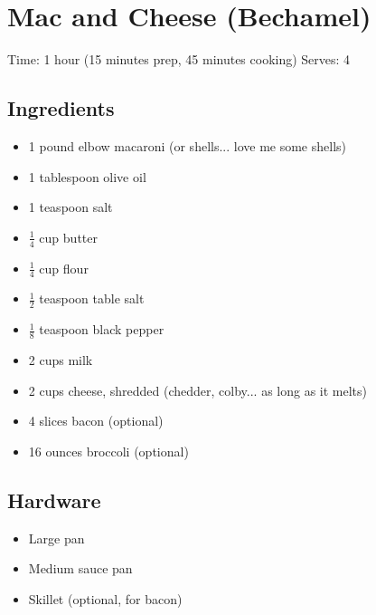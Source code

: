 \section{Mac and Cheese (Bechamel)}
\label{macAndCheeseBechamel}
\setcounter{secnumdepth}{0}
Time: 1 hour (15 minutes prep, 45 minutes cooking)
Serves: 4

\begin{multicols}{2}
\subsection*{Ingredients}
\begin{itemize}
    \item 1 pound elbow macaroni (or shells... love me some shells)
    \item 1 tablespoon olive oil
    \item 1 teaspoon salt
    \item \( \frac{1}{4} \) cup butter
    \item \( \frac{1}{4} \) cup flour
    \item \( \frac{1}{2} \) teaspoon table salt
    \item \( \frac{1}{8} \) teaspoon black pepper
    \item 2 cups milk
    \item 2 cups cheese, shredded (chedder, colby... as long as it melts)
    \item 4 slices bacon (optional)
    \item 16 ounces broccoli (optional)
\end{itemize}

\subsection*{Hardware}
\begin{itemize}
    \item Large pan
    \item Medium sauce pan
    \item Skillet (optional, for bacon)
\end{itemize}
\clearpage


\end{multicols}
